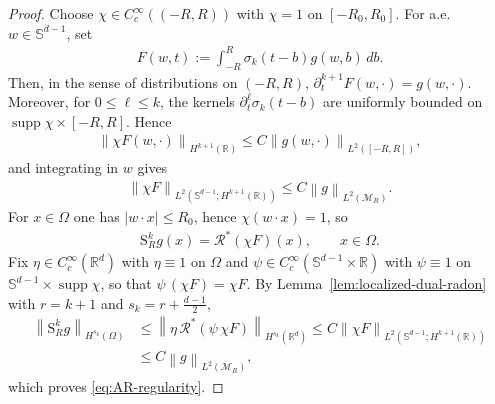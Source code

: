 \documentclass[12pt]{article}
\numberwithin{equation}{section}
\numberwithin{figure}{section}
\numberwithin{equation}{section}
\newcommand{\R}{\mathbb{R}}
\newcommand{\Sph}{\mathbb S}
\newcommand{\MR}{\mathcal M_R}
\newcommand{\norm}[1]{\left\|#1\right\|}
\DeclareMathOperator{\supp}{supp}
\begin{document}
\begin{proof}
Choose $\chi\in C_c^\infty((-R,R))$ with $\chi=1$ on $[-R_0,R_0]$. For a.e.
$w\in\Sph^{d-1}$, set
\begin{align*}
    F(w,t):=\int_{-R}^R \sigma_k(t-b)g(w,b)\,db .
\end{align*}
Then, in the sense of distributions on $(-R,R)$,
$\partial_t^{k+1}F(w,\cdot)=g(w,\cdot)$. Moreover, for $0\le\ell\le k$, the kernels
$\partial_t^\ell\sigma_k(t-b)$ are uniformly bounded on
$\supp\chi\times[-R,R]$. Hence
\begin{align*}
    \norm{\chi F(w,\cdot)}_{H^{k+1}(\R)}
    \le C\norm{g(w,\cdot)}_{L^2([-R,R])},
\end{align*}
and integrating in $w$ gives
\begin{align*}
    \norm{\chi F}_{L^2(\Sph^{d-1};H^{k+1}(\R))}
    \le C\norm{g}_{L^2(\MR)}.
\end{align*}
For $x\in\Omega$ one has $|w\cdot x|\le R_0$, hence $\chi(w\cdot x)=1$, so
\begin{align*}
    \mathrm{S}^k_R g(x)=\mathcal R^*(\chi F)(x),
    \qquad x\in\Omega .
\end{align*}
Fix $\eta\in C_c^\infty(\R^d)$ with $\eta\equiv1$ on $\Omega$ and
$\psi\in C_c^\infty(\Sph^{d-1}\times\R)$ with $\psi\equiv1$ on
$\Sph^{d-1}\times\supp\chi$, so that $\psi\,(\chi F)=\chi F$. By
Lemma~\ref{lem:localized-dual-radon} with $r=k+1$ and
$s_k=r+\tfrac{d-1}{2}$,
\begin{align*}
    \norm{\mathrm{S}^k_R g}_{H^{s_k}(\Omega)}
    &\le \norm{\eta\,\mathcal R^*(\psi\,\chi F)}_{H^{s_k}(\R^d)}
    \le C\norm{\chi F}_{L^2(\Sph^{d-1};H^{k+1}(\R))}
    \nonumber\\
    &\le C\norm{g}_{L^2(\MR)},
\end{align*}
which proves \eqref{eq:AR-regularity}.
\end{proof}
\end{document}
